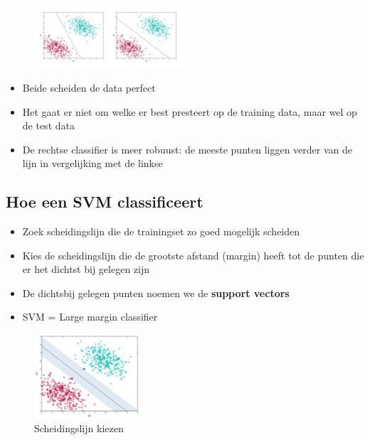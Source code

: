 \documentclass{article}
\begin{document}
\begin{figure}[H]
    \centering
    \includegraphics[width=0.5\textwidth]{svm-classifiers.png}
\end{figure}

\begin{itemize}
    \item Beide scheiden de data perfect
    \item Het gaat er niet om welke er best presteert op de training data, maar wel op de test data
    \item De rechtse classifier is meer robuust: de meeste punten liggen verder van de lijn in vergelijking met de linkse
\end{itemize}

\subsection{Hoe een SVM classificeert}

\begin{itemize}
    \item Zoek scheidingslijn die de trainingset zo goed mogelijk scheiden
    \item Kies de scheidingslijn die de grootste afstand (margin) heeft tot de punten die er het dichtst bij gelegen zijn
    \item De dichtsbij gelegen punten noemen we de \textbf{support vectors}
    \item SVM = Large margin classifier
\end{itemize}

\begin{figure}[H]
    \centering
    \includegraphics[width=0.35\textwidth]{svm-hoe.png}
    \caption{Scheidingslijn kiezen}
\end{figure}
\end{document}
